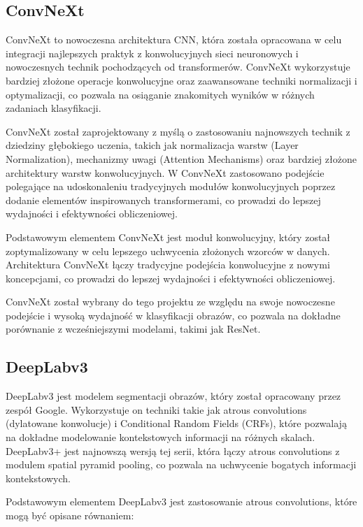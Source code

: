 \subsection*{ConvNeXt}

ConvNeXt to nowoczesna architektura CNN, która została opracowana w celu integracji najlepszych praktyk z konwolucyjnych 
sieci neuronowych i nowoczesnych technik pochodzących od transformerów. ConvNeXt wykorzystuje bardziej złożone operacje 
konwolucyjne oraz zaawansowane techniki normalizacji i optymalizacji, co pozwala na osiąganie znakomitych wyników w 
różnych zadaniach klasyfikacji.

ConvNeXt został zaprojektowany z myślą o zastosowaniu najnowszych technik z dziedziny głębokiego uczenia, takich jak 
normalizacja warstw (Layer Normalization), mechanizmy uwagi (Attention Mechanisms) oraz bardziej złożone architektury 
warstw konwolucyjnych. W ConvNeXt zastosowano podejście polegające na udoskonaleniu tradycyjnych modułów konwolucyjnych 
poprzez dodanie elementów inspirowanych transformerami, co prowadzi do lepszej wydajności i efektywności obliczeniowej.

Podstawowym elementem ConvNeXt jest moduł konwolucyjny, który został zoptymalizowany w celu lepszego uchwycenia 
złożonych wzorców w danych. Architektura ConvNeXt łączy tradycyjne podejścia konwolucyjne z nowymi koncepcjami, co 
prowadzi do lepszej wydajności i efektywności obliczeniowej.

ConvNeXt został wybrany do tego projektu ze względu na swoje nowoczesne podejście i wysoką wydajność w klasyfikacji 
obrazów, co pozwala na dokładne porównanie z wcześniejszymi modelami, takimi jak ResNet.

\subsection*{DeepLabv3}

DeepLabv3 jest modelem segmentacji obrazów, który został opracowany przez zespół Google. Wykorzystuje on techniki 
takie jak atrous convolutions (dylatowane konwolucje) i Conditional Random Fields (CRFs), które pozwalają na dokładne 
modelowanie kontekstowych informacji na różnych skalach. DeepLabv3+ jest najnowszą wersją tej serii, która łączy atrous 
convolutions z modulem spatial pyramid pooling, co pozwala na uchwycenie bogatych informacji kontekstowych.

Podstawowym elementem DeepLabv3 jest zastosowanie atrous convolutions, które mogą być opisane równaniem:

